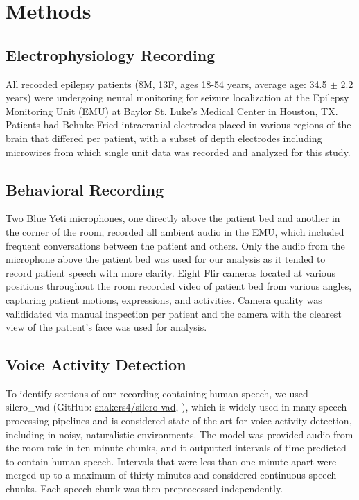 \documentclass[pdflatex,sn-basic]{sn-jnl}%
\theoremstyle{thmstyleone}%
\theoremstyle{thmstyletwo}%
\theoremstyle{thmstylethree}%
\begin{document}
\section{Methods}\label{sec11}

\subsection{Electrophysiology Recording}\label{subsec1}
All recorded epilepsy patients (8M, 13F, ages 18-54 years, average age: 34.5 $\pm$ 2.2 years) were undergoing neural monitoring for seizure localization at the Epilepsy Monitoring Unit (EMU) at Baylor St. Luke’s Medical Center in Houston, TX. Patients had Behnke-Fried intracranial electrodes placed in various regions of the brain that differed per patient, with a subset of depth electrodes including microwires from which single unit data was recorded and analyzed for this study.

\subsection{Behavioral Recording}\label{subsec2}
Two Blue Yeti microphones, one directly above the patient bed and another in the corner of the room, recorded all ambient audio in the EMU, which included frequent conversations between the patient and others. Only the audio from the microphone above the patient bed was used for our analysis as it tended to record patient speech with more clarity. Eight Flir cameras located at various positions throughout the room recorded video of patient bed from various angles, capturing patient motions, expressions, and activities. Camera quality was valididated via manual inspection per patient and the camera with the clearest view of the patient's face was used for analysis.

\subsection{Voice Activity Detection}\label{subsec3}
To identify sections of our recording containing human speech, we used silero\_vad (GitHub: \href{https://github.com/snakers4/silero-vad}{snakers4/silero-vad}, \citealp{bib43}), which is widely used in many speech processing pipelines and is considered state-of-the-art for voice activity detection, including in noisy, naturalistic environments. The model was provided audio from the room mic in ten minute chunks, and it outputted intervals of time predicted to contain human speech. Intervals that were less than one minute apart were merged up to a maximum of thirty minutes and considered continuous speech chunks. Each speech chunk was then preprocessed independently.
\end{document}
